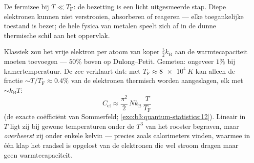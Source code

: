 \begin{omfigure}

{\small De fermizee bij $T \ll T_{\text{F}}$: de bezetting is een licht
uitgesmeerde stap. Diepe elektronen kunnen niet verstrooien, absorberen of
reageren --- elke toegankelijke toestand is bezet; de hele fysica van
metalen speelt zich af in de dunne thermische schil aan het oppervlak.}
\end{omfigure}

\begin{example}\label{ex:b3:quantum-statistics:heat}
Klassiek zou het vrije elektron per atoom van koper $\tfrac32
k_{\text{B}}$ aan de warmtecapaciteit moeten toevoegen --- $50\%$ boven op
Dulong--Petit. Gemeten: ongeveer $1\%$ bij kamertemperatuur. De zee
verklaart dat: met $T_{\text{F}} \approx \qty{8e4}{K}$ kan alleen de
fractie $\sim T/T_{\text{F}} \approx 0.4\%$ van de elektronen thermisch
worden aangeslagen, elk met $\sim k_{\text{B}}T$:
\[
C_{\text{el}} \approx \frac{\pi^2}{2}\,
Nk_{\text{B}}\,\frac{T}{T_{\text{F}}}
\]
(de exacte coëfficiënt van Sommerfeld;
\cref{exo:b3:quantum-statistics:12}). Lineair in $T$ ligt zij bij gewone
temperaturen onder de $T^3$ van het rooster begraven, maar
\emph{overheerst} zij onder enkele kelvin --- precies zoals calorimeters
vinden, waarmee in één klap het raadsel is opgelost van de elektronen die
wel stroom dragen maar geen warmtecapaciteit.
\end{example}

